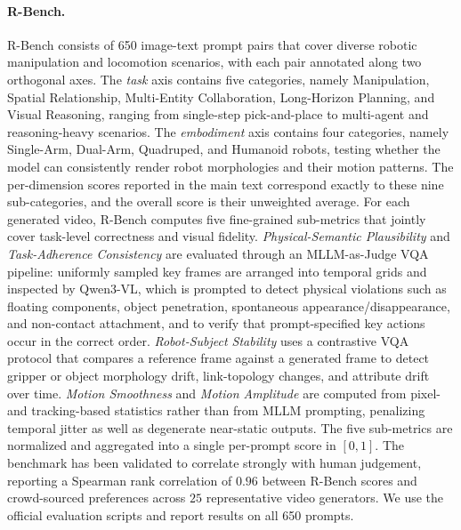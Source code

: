 \documentclass{llmxive}
\providecommand{\emph}[1]{\textit{#1}}
\begin{document}
\paragraph{R-Bench.}
R-Bench consists of 650 image-text prompt pairs that cover diverse robotic manipulation and
locomotion scenarios, with each pair annotated along two orthogonal axes. The
\emph{task} axis contains five categories, namely Manipulation, Spatial Relationship,
Multi-Entity Collaboration, Long-Horizon Planning, and Visual Reasoning, ranging from
single-step pick-and-place to multi-agent and reasoning-heavy scenarios. The
\emph{embodiment} axis contains four categories, namely Single-Arm, Dual-Arm, Quadruped,
and Humanoid robots, testing whether the model can consistently render robot morphologies
and their motion patterns. The per-dimension scores reported in the main text correspond
exactly to these nine sub-categories, and the overall score is their unweighted average.
For each generated video, R-Bench computes five fine-grained sub-metrics that jointly
cover task-level correctness and visual fidelity. \emph{Physical-Semantic Plausibility}
and \emph{Task-Adherence Consistency} are evaluated through an MLLM-as-Judge VQA pipeline:
uniformly sampled key frames are arranged into temporal grids and inspected by Qwen3-VL,
which is prompted to detect physical violations such as floating components, object
penetration, spontaneous appearance/disappearance, and non-contact attachment, and to
verify that prompt-specified key actions occur in the correct order. \emph{Robot-Subject
Stability} uses a contrastive VQA protocol that compares a reference frame against a
generated frame to detect gripper or object morphology drift, link-topology changes, and
attribute drift over time. \emph{Motion Smoothness} and \emph{Motion Amplitude} are
computed from pixel- and tracking-based statistics rather than from MLLM prompting,
penalizing temporal jitter as well as degenerate near-static outputs. The five sub-metrics
are normalized and aggregated into a single per-prompt score in $[0, 1]$. The benchmark
has been validated to correlate strongly with human judgement, reporting a Spearman rank
correlation of $0.96$ between R-Bench scores and crowd-sourced preferences across
$25$ representative video generators. We use the official evaluation scripts and report
results on all 650 prompts.
\end{document}
